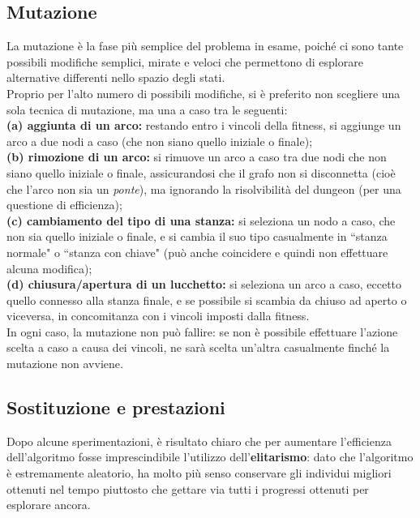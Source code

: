 \documentclass[12pt,titlepage]{article}
\begin{document}
\subsection {Mutazione}

La mutazione è la fase più semplice del problema in esame, poiché ci sono tante possibili modifiche semplici, mirate e veloci che permettono di esplorare alternative differenti nello spazio degli stati.\\

\noindent Proprio per l'alto numero di possibili modifiche, si è preferito non scegliere una sola tecnica di mutazione, ma una a caso tra le seguenti:\\
\textbf{(a) aggiunta di un arco:} restando entro i vincoli della fitness, si aggiunge un arco a due nodi a caso (che non siano quello iniziale o finale);\\
\textbf{(b) rimozione di un arco:} si rimuove un arco a caso tra due nodi che non siano quello iniziale o finale, assicurandosi che il grafo non si disconnetta (cioè che l'arco non sia un \textit{ponte}), ma ignorando la risolvibilità del dungeon (per una questione di efficienza);\\
\textbf{(c) cambiamento del tipo di una stanza:} si seleziona un nodo a caso, che non sia quello iniziale o finale, e si cambia il suo tipo casualmente in ``stanza normale" o ``stanza con chiave" (può anche coincidere e quindi non effettuare alcuna modifica);\\
\textbf{(d) chiusura/apertura di un lucchetto:} si seleziona un arco a caso, eccetto quello connesso alla stanza finale, e se possibile si scambia da chiuso ad aperto o viceversa, in concomitanza con i vincoli imposti dalla fitness.\\

\noindent In ogni caso, la mutazione non può fallire: se non è possibile effettuare l'azione scelta a caso a causa dei vincoli, ne sarà scelta un'altra casualmente finché la mutazione non avviene.

\subsection {Sostituzione e prestazioni}

Dopo alcune sperimentazioni, è risultato chiaro che per aumentare l'efficienza dell'algoritmo fosse imprescindibile l'utilizzo dell'\textbf{elitarismo}: dato che l'algoritmo è estremamente aleatorio, ha molto più senso conservare gli individui migliori ottenuti nel tempo piuttosto che gettare via tutti i progressi ottenuti per esplorare ancora.\\
\end{document}
